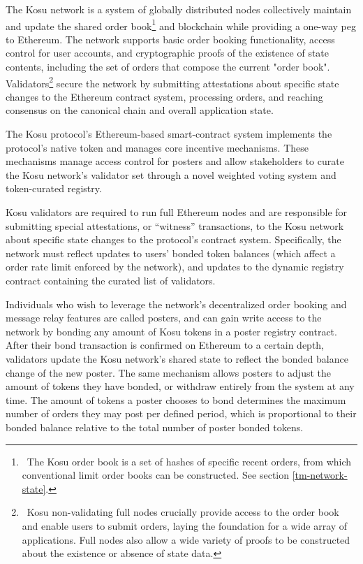 \documentclass[10pt]{article}
\begin{document}
The Kosu network is a system of globally distributed nodes collectively maintain and update the shared order book\footnote{\ The Kosu order book is a set of hashes of specific recent orders, from which conventional limit order books can be constructed. See section \ref{tm-network-state}.} and blockchain while providing a one-way peg to Ethereum. The network supports basic order booking functionality, access control for user accounts, and cryptographic proofs of the existence of state contents, including the set of orders that compose the current "order book". Validators\footnote{\ Kosu non-validating full nodes crucially provide access to the order book and enable users to submit orders, laying the foundation for a wide array of applications. Full nodes also allow a wide variety of proofs to be constructed about the existence or absence of state data.} secure the network by submitting attestations about specific state changes to the Ethereum contract system, processing orders, and reaching consensus on the canonical chain and overall application state. 
\medskip

The Kosu protocol’s Ethereum-based smart-contract system implements the protocol’s native token and manages core incentive mechanisms. These mechanisms manage access control for posters and allow stakeholders to curate the Kosu network’s validator set through a novel weighted voting system and token-curated registry.
\medskip

Kosu validators are required to run full Ethereum nodes and are responsible for submitting special attestations, or “witness” transactions, to the Kosu network about specific state changes to the protocol’s contract system. Specifically, the network must reflect updates to users’ bonded token balances (which affect a order rate limit enforced by the network), and updates to the dynamic registry contract containing the curated list of validators.
\medskip

Individuals who wish to leverage the network’s decentralized order booking and message relay features are called posters, and can gain write access to the network by bonding any amount of Kosu tokens in a poster registry contract. After their bond transaction is confirmed on Ethereum to a certain depth, validators update the Kosu network's shared state to reflect the bonded balance change of the new poster. The same mechanism allows posters to adjust the amount of tokens they have bonded, or withdraw entirely from the system at any time. The amount of tokens a poster chooses to bond determines the maximum number of orders they may post per defined period, which is proportional to their bonded balance relative to the total number of poster bonded tokens.
\medskip
\end{document}
